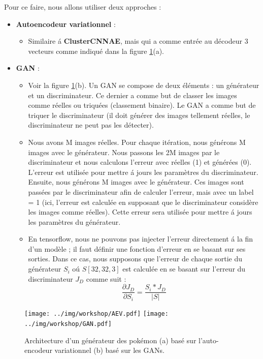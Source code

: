 \documentclass[11pt, a4paper]{article}
\begin{document}
Pour ce faire, nous allons utiliser deux approches :
\begin{itemize}
	\item \textbf{Autoencodeur variationnel} : 
	\begin{itemize}
		\item Similaire \'a \textbf{ClusterCNNAE}, mais qui a comme entrée au décodeur 3 vecteurs comme indiqué dans la figure \ref{fig:gen}(a).
	\end{itemize}
	\item \textbf{GAN} : 
	\begin{itemize}
		\item Voir la figure \ref{fig:gen}(b). Un GAN se compose de deux éléments : un générateur et un discriminateur. 
		Ce dernier a comme but de classer les images comme réelles ou triquées (classement binaire). 
		Le GAN a comme but de triquer le discriminateur (il doit générer des images tellement réelles, le discriminateur ne peut pas les détecter).
		\item Nous avons M images réelles. 
		Pour chaque itération, nous générons M images avec le générateur. 
		Nous passons les 2M images par le discriminateur et nous calculons l'erreur avec réelles (1) et générées (0).
		L'erreur est utilisée pour mettre \'a jours les paramètres du discriminateur.
		Ensuite, nous générons M images avec le générateur. 
		Ces images sont passées par le discriminateur afin de calculer l'erreur, mais avec un label = 1 (ici, l'erreur est calculée en supposant que le discriminateur considère les images comme réelles).
		Cette erreur sera utilisée pour mettre \'a jours les paramètres du générateur.
		\item En tensorflow, nous ne pouvons pas injecter l'erreur directement \'a la fin d'un modèle ; il faut définir une fonction d'erreur en se basant sur ses sorties.
		Dans ce cas, nous supposons que l'erreur de chaque sortie du générateur $S_i$ o\'u $S[32, 32, 3]$ est calculée en se basant sur l'erreur du discriminateur $J_D$ comme suit :
		\[\frac{\partial J_D}{\partial S_i} = \frac{S_i * J_D}{|S|}\]
		
	\end{itemize}
\end{itemize}

\begin{figure}[htp]
	\centering
	\texttt{[image: ../img/workshop/AEV.pdf]}
	\texttt{[image: ../img/workshop/GAN.pdf]}
	\caption{Architecture d'un générateur des pokémon (a)  basé sur l'auto-encodeur variationnel (b) basé sur les GANs.}
	\label{fig:gen}
\end{figure}
\end{document}
